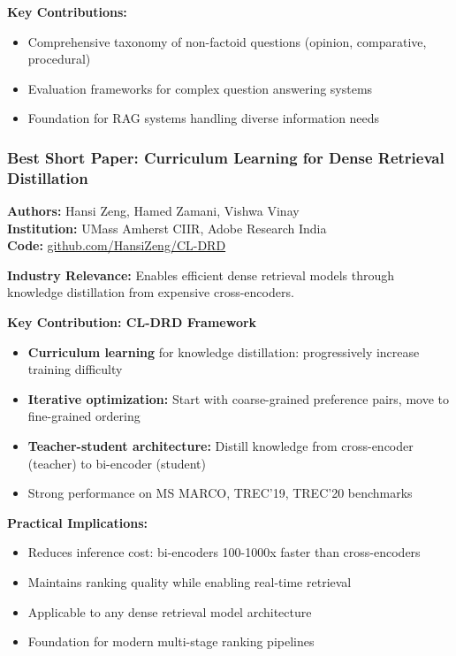 \documentclass[11pt,letterpaper]{article}
\begin{document}
\textbf{Key Contributions:}
\begin{itemize}[leftmargin=*]
    \item Comprehensive taxonomy of non-factoid questions (opinion, comparative, procedural)
    \item Evaluation frameworks for complex question answering systems
    \item Foundation for RAG systems handling diverse information needs
\end{itemize}

\subsubsection{Best Short Paper: Curriculum Learning for Dense Retrieval Distillation}
\textbf{Authors:} Hansi Zeng, Hamed Zamani, Vishwa Vinay\\
\textbf{Institution:} UMass Amherst CIIR, Adobe Research India\\
\textbf{Code:} \href{https://github.com/HansiZeng/CL-DRD}{github.com/HansiZeng/CL-DRD}

\textbf{Industry Relevance:} Enables efficient dense retrieval models through knowledge distillation from expensive cross-encoders.

\textbf{Key Contribution: CL-DRD Framework}
\begin{itemize}[leftmargin=*]
    \item \textbf{Curriculum learning} for knowledge distillation: progressively increase training difficulty
    \item \textbf{Iterative optimization:} Start with coarse-grained preference pairs, move to fine-grained ordering
    \item \textbf{Teacher-student architecture:} Distill knowledge from cross-encoder (teacher) to bi-encoder (student)
    \item Strong performance on MS MARCO, TREC'19, TREC'20 benchmarks
\end{itemize}

\textbf{Practical Implications:}
\begin{itemize}[leftmargin=*]
    \item Reduces inference cost: bi-encoders 100-1000x faster than cross-encoders
    \item Maintains ranking quality while enabling real-time retrieval
    \item Applicable to any dense retrieval model architecture
    \item Foundation for modern multi-stage ranking pipelines
\end{itemize}
\end{document}
